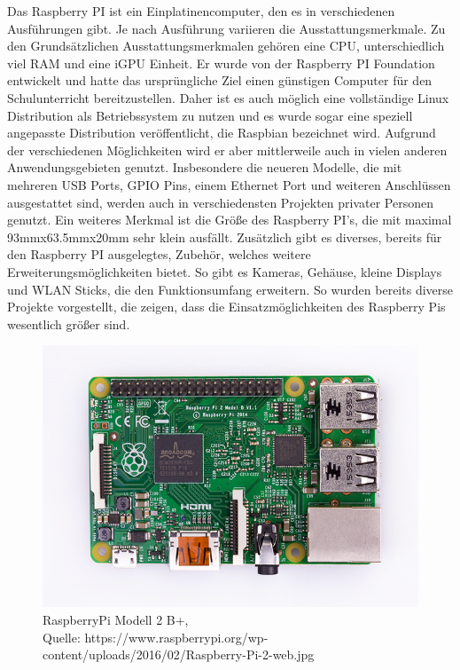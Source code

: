 \documentclass[ngerman]{scrartcl} %
\begin{document}
Das Raspberry PI ist ein Einplatinencomputer, den es in verschiedenen Ausführungen gibt. Je nach Ausführung variieren die Ausstattungsmerkmale. Zu den Grundsätzlichen Ausstattungsmerkmalen gehören eine CPU, unterschiedlich viel RAM und eine iGPU Einheit. Er wurde von der Raspberry PI Foundation entwickelt und hatte das ursprüngliche Ziel einen günstigen Computer für den Schulunterricht bereitzustellen. Daher ist es auch möglich eine vollständige Linux Distribution als Betriebssystem zu nutzen und es wurde sogar eine speziell angepasste Distribution veröffentlicht, die Raspbian bezeichnet wird. 
Aufgrund der verschiedenen Möglichkeiten wird er aber mittlerweile auch in vielen anderen Anwendungsgebieten genutzt. Insbesondere die neueren Modelle, die mit mehreren USB Ports, GPIO Pins, einem Ethernet Port und weiteren Anschlüssen ausgestattet sind, werden auch in verschiedensten Projekten privater Personen genutzt. Ein weiteres Merkmal ist die Größe des Raspberry PI's, die mit maximal 93mmx63.5mmx20mm sehr klein ausfällt. Zusätzlich gibt es diverses, bereits für den Raspberry PI ausgelegtes, Zubehör, welches weitere Erweiterungsmöglichkeiten bietet. So gibt es Kameras, Gehäuse, kleine Displays und WLAN Sticks, die den Funktionsumfang erweitern. So wurden bereits diverse Projekte vorgestellt, die zeigen, dass die Einsatzmöglichkeiten des Raspberry Pis wesentlich größer sind. 
\\
\begin{figure}[!htb]
	\centering
	\includegraphics[scale=0.5]{Raspberry-Pi-2-web.png}
	\caption[RaspberryPi Modell 2 B]{RaspberryPi Modell 2 B+,\\ Quelle: https://www.raspberrypi.org/wp-content/uploads/2016/02/Raspberry-Pi-2-web.jpg}
\end{figure}
\end{document}
